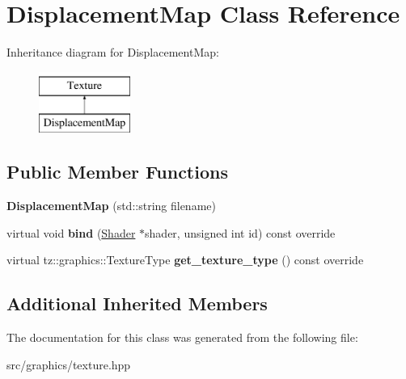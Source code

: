 \hypertarget{class_displacement_map}{}\section{Displacement\+Map Class Reference}
\label{class_displacement_map}
Inheritance diagram for Displacement\+Map\+:\begin{figure}[H]
\begin{center}
\leavevmode
\includegraphics[height=2.000000cm]{class_displacement_map}
\end{center}
\end{figure}
\subsection*{Public Member Functions}
\begin{DoxyCompactItemize}
\item 
\mbox{\label{class_displacement_map_ad9fb0c5ac51d5dede9d6cbd0721add36}} 
{\bfseries Displacement\+Map} (std\+::string filename)
\item 
\mbox{\label{class_displacement_map_afbc019ec3ec956d0eac44442d4346274}} 
virtual void {\bfseries bind} (\mbox{\hyperlink{class_shader}{Shader}} $\ast$shader, unsigned int id) const override
\item 
\mbox{\label{class_displacement_map_a86b4259eb46e198c6d535461c0665019}} 
virtual tz\+::graphics\+::\+Texture\+Type {\bfseries get\+\_\+texture\+\_\+type} () const override
\end{DoxyCompactItemize}
\subsection*{Additional Inherited Members}


The documentation for this class was generated from the following file\+:\begin{DoxyCompactItemize}
\item 
src/graphics/texture.\+hpp\end{DoxyCompactItemize}
